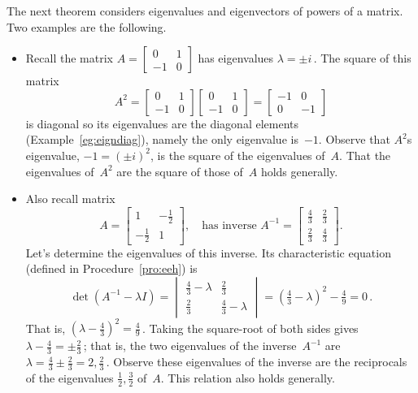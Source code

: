 \begin{example} \label{eg:2x2powmat}
The next theorem considers eigenvalues and eigenvectors of powers of a matrix.  
Two examples are the following.
\begin{itemize}
\item Recall the matrix \(A=\begin{bmatrix} 0&1\\-1&0 \end{bmatrix}\) has eigenvalues \(\lambda=\pm i\)\,.  The square of this matrix
\begin{equation*}
A^2=\begin{bmatrix} 0&1\\-1&0 \end{bmatrix}\begin{bmatrix} 0&1\\-1&0 \end{bmatrix}
=\begin{bmatrix} -1&0\\0&-1 \end{bmatrix}
\end{equation*}
is diagonal so its eigenvalues are the diagonal elements (Example~\ref{eg:eigndiag}), namely the only eigenvalue is~\(-1\).
Observe that \(A^2\)s eigenvalue, \(-1=(\pm i)^2\), is the square of the eigenvalues of~\(A\).
That the eigenvalues of~\(A^2\) are the square of those of~\(A\) holds generally.

\item Also recall matrix 
\begin{equation*}
A=\begin{bmatrix} 1&-\frac12\\-\frac12&1 \end{bmatrix},
\quad\text{has inverse }A^{-1}=\begin{bmatrix} \frac43&\frac23\\\frac23&\frac43 \end{bmatrix}.
\end{equation*}
Let's determine the eigenvalues of this inverse.
Its characteristic equation (defined in Procedure~\ref{pro:eeh}) is
\begin{equation*}
\det(A^{-1}-\lambda I)
=\begin{vmatrix} \frac43-\lambda&\frac23\\\frac23&\frac43-\lambda \end{vmatrix}
=(\tfrac43-\lambda)^2-\tfrac49=0\,.
\end{equation*}
That is, \((\lambda-\tfrac43)^2=\tfrac49\)\,.
Taking the square-root of both sides gives \(\lambda-\tfrac43=\pm\tfrac23\)\,; that is, the two eigenvalues of the inverse~\(A^{-1}\) are \(\lambda=\tfrac43\pm\tfrac23=2,\tfrac23\)\,.
Observe these eigenvalues of the inverse are the reciprocals of the eigenvalues \(\frac12,\frac32\) of~\(A\).
This relation also holds generally.


\end{itemize}
\end{example}
